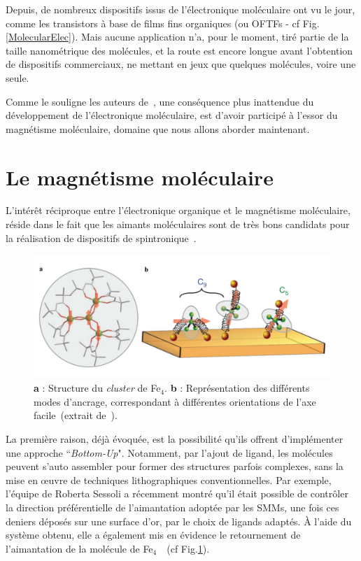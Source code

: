 Depuis, de nombreux dispositifs issus de l'électronique moléculaire ont vu le jour, comme les  transistors à base de films fins organiques (ou OFTFs - cf Fig.\ref{MolecularElec}). Mais aucune application n'a, pour le moment, tiré partie de la taille nanométrique des molécules, et la route est encore longue avant l'obtention de dispositifs commerciaux, ne mettant en jeux que quelques molécules, voire une seule.

Comme le souligne les auteurs de~\cite{Gatteschi2006}, une conséquence plus inattendue du développement de l'électronique moléculaire, est d'avoir participé à l'essor du magnétisme moléculaire, domaine que nous allons aborder maintenant.


\section{Le magnétisme moléculaire}
L’intérêt réciproque entre l'électronique organique et le magnétisme moléculaire, réside dans le fait que les aimants moléculaires sont de très bons candidats pour la réalisation de dispositifs de spintronique~\cite{Bogani2008,Sanvito2011}.

\begin{figure}
\centering \includegraphics[scale=0.45]{Spintronique/MolecularMag2/MolecularMag2.pdf}
\caption{\textbf{a} : Structure du \textit{cluster} de Fe$_4$. \textbf{b} : Représentation des différents modes d'ancrage, correspondant à différentes orientations de l'axe facile~(extrait de~\cite{Mannini2010}).}
\label{MolecularMag2}
\end{figure}

La première raison, déjà évoquée, est la possibilité qu'ils offrent d'implémenter une approche ``\textit{Bottom-Up}".
Notamment, par l'ajout de ligand, les molécules peuvent s'auto assembler pour former des structures parfois complexes, sans la mise en œuvre de techniques lithographiques conventionnelles. Par exemple, l'équipe de Roberta Sessoli a récemment montré qu'il était possible de contrôler la direction préférentielle de l'aimantation adoptée par les SMMs, une fois ces deniers déposés sur une surface d'or, par le choix de ligands adaptés. À l'aide du système obtenu, elle a également mis en évidence le retournement de l'aimantation de la molécule de Fe$_{4}$~\cite{Mannini2010}~(cf Fig.\ref{MolecularMag2}).

